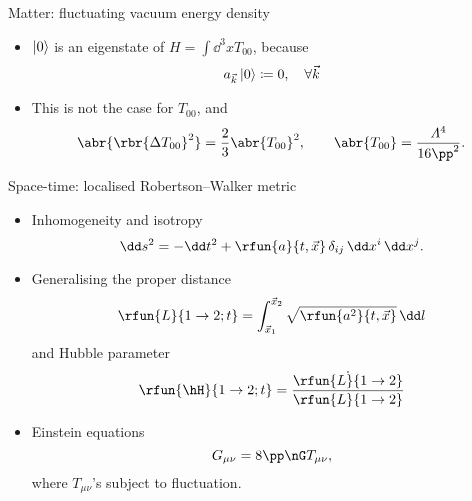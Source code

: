 \documentclass{beamer}
\begin{document}
\begin{frame}{Matter: fluctuating vacuum energy density}
\begin{itemize}
\item
$\Ket{0}$ is an eigenstate of $H = \int \dd^3 x T_{00}$, because
\begin{equation}
a_{\vec k} \Ket{0} \coloneqq 0,\quad \forall \vec k
\end{equation}
\item This is not the case for $T_{00}$, and
\begin{equation}
\abr{\rbr{\Delta T_{00}}^2} = \frac{2}{3}\abr{T_{00}}^2,\qquad \abr{T_{00}} = 
\frac{\varLambda^4}{16\pp^2}.
\end{equation}

\end{itemize}

\end{frame}


\begin{frame}{Space-time: localised Robertson--Walker metric}
\begin{itemize}
\item \alert{In}homogeneity and isotropy
\begin{equation}
\dd s^2 = -\dd t^2 + \rfun{a}{t, \vec{x}}\,\delta_{ij}\,\dd x^i\,\dd x^j.
\end{equation}
\item Generalising the proper distance
\begin{equation}
\rfun{L}{1\to 2; t} = \int_{\vec x_1}^{\vec x_2}\sqrt{\rfun{a^2}{t,\vec 
x}}\,\dd l
\end{equation}
and Hubble parameter
\begin{equation}
\rfun{\hH}{1\to 2; t} = \frac{\dot \rfun{L}{1\to 2}}{\rfun{L}{1\to 2}}
\end{equation}
\item Einstein equations
\begin{equation}
G_{\mu\nu} = 8\pp\nG T_{\mu\nu},
\label{eq:E-20}
\end{equation}
where $T_{\mu\nu}$'s subject to fluctuation.
\end{itemize}


\end{frame}

\end{document}
